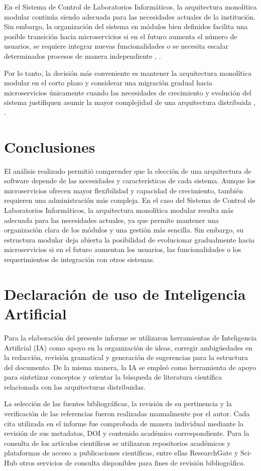 \documentclass[10pt,conference]{IEEEtran}
\begin{document}
En el Sistema de Control de Laboratorios Informáticos, la arquitectura monolítica modular continúa siendo adecuada para las necesidades actuales de la institución. Sin embargo, la organización del sistema en módulos bien definidos facilita una posible transición hacia microservicios si en el futuro aumenta el número de usuarios, se requiere integrar nuevas funcionalidades o se necesita escalar determinados procesos de manera independiente \cite{ref18}, \cite{ref20}.

Por lo tanto, la decisión más conveniente es mantener la arquitectura monolítica modular en el corto plazo y considerar una migración gradual hacia microservicios únicamente cuando las necesidades de crecimiento y evolución del sistema justifiquen asumir la mayor complejidad de una arquitectura distribuida \cite{ref10}, \cite{ref18}.

\section{Conclusiones}
El análisis realizado permitió comprender que la elección de una arquitectura de software depende de las necesidades y características de cada sistema. Aunque los microservicios ofrecen mayor flexibilidad y capacidad de crecimiento, también requieren una administración más compleja. En el caso del Sistema de Control de Laboratorios Informáticos, la arquitectura monolítica modular resulta más adecuada para las necesidades actuales, ya que permite mantener una organización clara de los módulos y una gestión más sencilla. Sin embargo, su estructura modular deja abierta la posibilidad de evolucionar gradualmente hacia microservicios si en el futuro aumentan los usuarios, las funcionalidades o los requerimientos de integración con otros sistemas.

\section*{Declaración de uso de Inteligencia Artificial}
Para la elaboración del presente informe se utilizaron herramientas de Inteligencia Artificial (IA) como apoyo en la organización de ideas, corregir ambigüedades en la redacción, revisión gramatical y generación de sugerencias para la estructura del documento. De la misma manera, la IA se empleó como herramienta de apoyo para sintetizar conceptos y orientar la búsqueda de literatura científica relacionada con las arquitecturas distribuidas.

La selección de las fuentes bibliográficas, la revisión de su pertinencia y la verificación de las referencias fueron realizadas manualmente por el autor. Cada cita utilizada en el informe fue comprobada de manera individual mediante la revisión de sus metadatos, DOI y contenido académico correspondiente. Para la consulta de los artículos científicos se utilizaron repositorios académicos y plataformas de acceso a publicaciones científicas, entre ellas ResearchGate y Sci-Hub otros servicios de consulta disponibles para fines de revisión bibliográfica.
\end{document}
